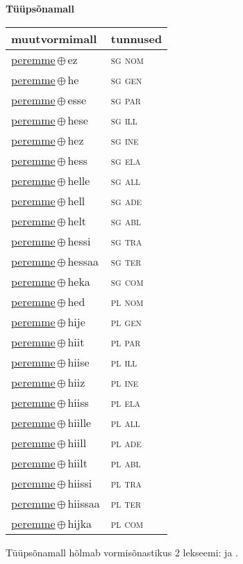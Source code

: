 

\vspace{3.5em}
\noindent \begin{minipage}{\textwidth}
\noindent \textbf{Tüüpsõnamall \,}\\

\begin{sideways}
\begin{tabular}{l l}
muutvormimall & tunnused \\
\hline
\underline{peremme}\,$\oplus$\,ez & \textsc{ sg nom } \\
\underline{peremme}\,$\oplus$\,he & \textsc{ sg gen } \\
\underline{peremme}\,$\oplus$\,esse & \textsc{ sg par } \\
\underline{peremme}\,$\oplus$\,hese & \textsc{ sg ill } \\
\underline{peremme}\,$\oplus$\,hez & \textsc{ sg ine } \\
\underline{peremme}\,$\oplus$\,hess & \textsc{ sg ela } \\
\underline{peremme}\,$\oplus$\,helle & \textsc{ sg all } \\
\underline{peremme}\,$\oplus$\,hell & \textsc{ sg ade } \\
\underline{peremme}\,$\oplus$\,helt & \textsc{ sg abl } \\
\underline{peremme}\,$\oplus$\,hessi & \textsc{ sg tra } \\
\underline{peremme}\,$\oplus$\,hessaa & \textsc{ sg ter } \\
\underline{peremme}\,$\oplus$\,heka & \textsc{ sg com } \\
\underline{peremme}\,$\oplus$\,hed & \textsc{ pl nom } \\
\underline{peremme}\,$\oplus$\,hije & \textsc{ pl gen } \\
\underline{peremme}\,$\oplus$\,hiit & \textsc{ pl par } \\
\underline{peremme}\,$\oplus$\,hiise & \textsc{ pl ill } \\
\underline{peremme}\,$\oplus$\,hiiz & \textsc{ pl ine } \\
\underline{peremme}\,$\oplus$\,hiiss & \textsc{ pl ela } \\
\underline{peremme}\,$\oplus$\,hiille & \textsc{ pl all } \\
\underline{peremme}\,$\oplus$\,hiill & \textsc{ pl ade } \\
\underline{peremme}\,$\oplus$\,hiilt & \textsc{ pl abl } \\
\underline{peremme}\,$\oplus$\,hiissi & \textsc{ pl tra } \\
\underline{peremme}\,$\oplus$\,hiissaa & \textsc{ pl ter } \\
\underline{peremme}\,$\oplus$\,hijka & \textsc{ pl com } \\
\end{tabular}
\end{sideways}
\label{tab:tüüpsõnamall-peremmeez}

\end{minipage}

 
\vspace{1em}
\noindent Tüüpsõnamall  hõlmab vormisõnastikus 2 lekseemi:  ja .
